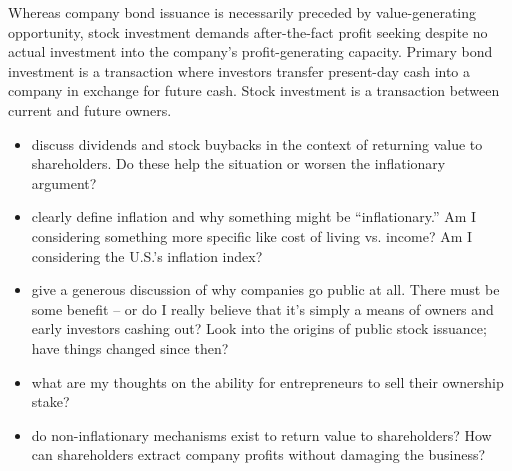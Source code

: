 Whereas company bond issuance is necessarily preceded by value-generating opportunity, stock investment demands after-the-fact profit seeking despite no actual investment into the company's profit-generating capacity.  Primary bond investment is a transaction where investors transfer present-day cash into a company in exchange for future cash.  Stock investment is a transaction between current and future owners.

\note{[Todo]:}
\begin{itemize}
    \item {} discuss dividends and stock buybacks in the context of returning value to shareholders.  Do these help the situation or worsen the inflationary argument?
    \item \note{[Inflation]:} clearly define inflation and why something might be ``inflationary.''  Am I considering something more specific like cost of living vs. income?  Am I considering the U.S.'s inflation index?
    \item \note{[IPOs]:} give a generous discussion of why companies go public at all.  There must be some benefit -- or do I really believe that it's simply a means of owners and early investors cashing out?  Look into the origins of public stock issuance; have things changed since then?
    \item {} what are my thoughts on the ability for entrepreneurs to sell their ownership stake?
    \item {} do non-inflationary mechanisms exist to return value to shareholders?  How can shareholders extract company profits without damaging the business?  
\end{itemize}